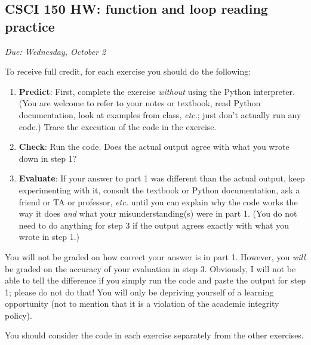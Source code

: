 \documentclass[]{article}
\date{}
\begin{document}
\hypertarget{csci-150-hw-function-and-loop-reading-practice}{%
\subsection{CSCI 150 HW: function and loop reading
practice}\label{csci-150-hw-function-and-loop-reading-practice}}

\emph{Due: Wednesday, October 2}

To receive full credit, for each exercise you should do the following:

\begin{enumerate}
\def\labelenumi{\arabic{enumi}.}
\item
  \textbf{Predict}: First, complete the exercise \emph{without} using
  the Python interpreter. (You are welcome to refer to your notes or
  textbook, read Python documentation, look at examples from class,
  \emph{etc.}; just don't actually run any code.) Trace the execution of
  the code in the exercise.
\item
  \textbf{Check}: Run the code. Does the actual output agree with what
  you wrote down in step 1?
\item
  \textbf{Evaluate}: If your answer to part 1 was different than the
  actual output, keep experimenting with it, consult the textbook or
  Python documentation, ask a friend or TA or professor, \emph{etc.}
  until you can explain why the code works the way it does \emph{and}
  what your misunderstanding(s) were in part 1. (You do not need to do
  anything for step 3 if the output agrees exactly with what you wrote
  in step 1.)
\end{enumerate}

You will not be graded on how correct your answer is in part 1. However,
you \emph{will} be graded on the accuracy of your evaluation in step 3.
Obviously, I will not be able to tell the difference if you simply run
the code and paste the output for step 1; please do not do that! You
will only be depriving yourself of a learning opportunity (not to
mention that it is a violation of the academic integrity policy).

You should consider the code in each exercise separately from the other
exercises.
\end{document}
